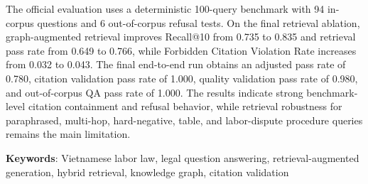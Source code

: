 \documentclass[11pt]{extarticle}
\begin{document}
The official evaluation uses a deterministic 100-query benchmark with 94 in-corpus questions and 6 out-of-corpus refusal tests. On the final retrieval ablation, graph-augmented retrieval improves Recall@10 from 0.735 to 0.835 and retrieval pass rate from 0.649 to 0.766, while Forbidden Citation Violation Rate increases from 0.032 to 0.043. The final end-to-end run obtains an adjusted pass rate of 0.780, citation validation pass rate of 1.000, quality validation pass rate of 0.980, and out-of-corpus QA pass rate of 1.000. The results indicate strong benchmark-level citation containment and refusal behavior, while retrieval robustness for paraphrased, multi-hop, hard-negative, table, and labor-dispute procedure queries remains the main limitation.

\textbf{Keywords}: Vietnamese labor law, legal question answering, retrieval-augmented generation, hybrid retrieval, knowledge graph, citation validation

\clearpage
{}








\clearpage
\printbibliography[heading=bibintoc,title={References}]

\appendix

\end{document}
